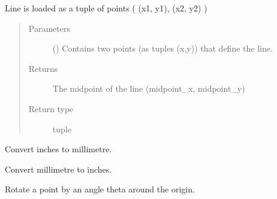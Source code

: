 \documentclass[letterpaper,10pt,english]{sphinxmanual}
\begin{document}
\begin{fulllineitems}
\begin{fulllineitems}
\sphinxAtStartPar
Line is loaded as a tuple of points ( (x1, y1), (x2, y2) )
\begin{quote}\begin{description}
\item[{Parameters}] \leavevmode
\sphinxAtStartPar
{} () \textendash{} Contains two points (as tuples (x,y)) that define the line.

\item[{Returns}] \leavevmode
\sphinxAtStartPar
{} \textendash{} The midpoint of the line (midpoint\_x, midpoint\_y)

\item[{Return type}] \leavevmode
\sphinxAtStartPar
tuple

\end{description}\end{quote}

\end{fulllineitems}


\begin{fulllineitems}
\label{\detokenize{index:pyopticaltable.Tools.inch_to_mm}}
\sphinxAtStartPar
Convert inches to millimetre.

\end{fulllineitems}


\begin{fulllineitems}
\label{\detokenize{index:pyopticaltable.Tools.mm_to_inch}}
\sphinxAtStartPar
Convert millimetre to inches.

\end{fulllineitems}


\begin{fulllineitems}
\label{\detokenize{index:pyopticaltable.Tools.rotate_point}}
\sphinxAtStartPar
Rotate a point by an angle theta around the origin.


\end{fulllineitems}
\end{fulllineitems}
\end{document}
